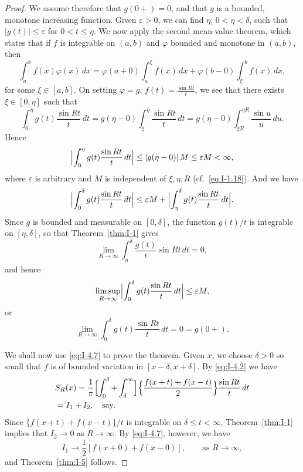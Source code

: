 \begin{proof}
We assume therefore that $g(0+)=0$, and that $g$ is a bounded, monotone increasing function. Given $\varepsilon>0$, we can find $\eta$, $0<\eta<\delta$, such that $|g(t)|\le\varepsilon$ for $0<t\le\eta$. We now apply the second mean-value theorem, which states that if $f$ is integrable on $(a,b)$ and $\varphi$ bounded and monotone in $(a,b)$, then
\begin{equation*}
\int_a^b f(x)\varphi(x)\,dx
=\varphi(a+0)\int_a^\xi f(x)\,dx+\varphi(b-0)\int_\xi^b f(x)\,dx,
\end{equation*}
for some $\xi\in[a,b]$. On setting $\varphi=g$, $f(t)=\frac{\sin Rt}{t}$, we see that there exists $\xi\in[0,\eta]$ such that
\begin{equation*}
\int_0^\eta g(t)\frac{\sin Rt}{t}\,dt
=g(\eta-0)\int_\xi^\eta\frac{\sin Rt}{t}\,dt
=g(\eta-0)\int_{\xi R}^{\eta R}\frac{\sin u}{u}\,du.
\end{equation*}
Hence
\begin{equation*}
\Bigl|\int_0^\eta g(t)\frac{\sin Rt}{t}\,dt\Bigr|
\le|g(\eta-0)|\,M\le\varepsilon M<\infty,
\end{equation*}
where $\varepsilon$ is arbitrary and $M$ is independent of $\xi,\eta,R$ (cf.\ \eqref{eq:I-1.18}). And we have
\begin{equation*}
\Bigl|\int_0^\delta g(t)\frac{\sin Rt}{t}\,dt\Bigr|
\le\varepsilon M+\Bigl|\int_\eta^\delta g(t)\frac{\sin Rt}{t}\,dt\Bigr|.
\end{equation*}
Since $g$ is bounded and measurable on $[0,\delta]$, the function $g(t)/t$ is integrable on $[\eta,\delta]$, so that Theorem~\ref{thm:I-1} gives
\begin{equation*}
\lim_{R\to\infty}\int_\eta^\delta\frac{g(t)}{t}\sin Rt\,dt=0,
\end{equation*}
and hence
\begin{equation*}
\limsup_{R\to\infty}\Bigl|\int_0^\delta g(t)\frac{\sin Rt}{t}\,dt\Bigr|\le\varepsilon M,
\end{equation*}
or
\begin{equation*}
\lim_{R\to\infty}\int_0^\delta g(t)\frac{\sin Rt}{t}\,dt=0=g(0+).
\end{equation*}

We shall now use \eqref{eq:I-4.7} to prove the theorem. Given $x$, we choose $\delta>0$ so small that $f$ is of bounded variation in $[x-\delta,x+\delta]$. By \eqref{eq:I-4.2} we have
\begin{equation*}
\begin{aligned}
&S_R(x) = \frac{1}{\pi}  \Bigl[\int_0^\delta+\int_\delta^\infty\Bigr]  \Bigl\{\frac{f(x+t)+f(x-t)}{2}\Bigr\}\frac{\sin Rt}{t}\,dt\\
&= I_1 + I_2,\quad\text{say}.
\end{aligned}
\end{equation*}
Since $\{f(x+t)+f(x-t)\}/t$ is integrable on $\delta\le t<\infty$, Theorem~\ref{thm:I-1} implies that $I_2\to 0$ as $R\to\infty$. By \eqref{eq:I-4.7}, however, we have
\begin{equation*}
I_1\to\frac12[f(x+0)+f(x-0)],\qquad\text{as }R\to\infty,
\end{equation*}
and Theorem~\ref{thm:I-5} follows.
\end{proof}

